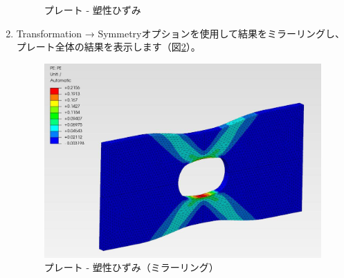 \begin{enumerate}
\begin{figure}[H]
	\caption{プレート - 塑性ひずみ}
	\label{fig:07-03}
	\end{figure}
	\vspace{-\baselineskip}
\item
  Transformation → Symmetryオプションを使用して結果をミラーリングし、プレート全体の結果を表示します（図\ref{fig:07-04}）。
	\begin{figure}[H]
	\centering
	\includegraphics[width=132mm]{fig/07-04.png}
	\caption{プレート - 塑性ひずみ（ミラーリング）}
	\label{fig:07-04}
	\end{figure}
\end{enumerate}